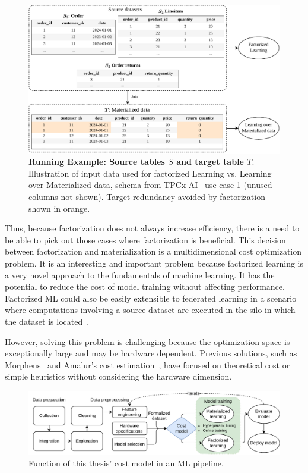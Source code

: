 \begin{figure}[h]
  \centering
  \includegraphics[width=0.95\linewidth]{chapters/01_introduction/figures/running-example-intro.pdf}
  \caption[Running Example: Source tables $S$ and target table $T$]{\textbf{Running Example: Source tables $S$ and target table $T$}. \\ Illustration of input data used for factorized Learning vs. Learning over Materialized data, schema from TPCx-AI~\cite{tpcx-ai} use case 1 (unused columns not shown). Target redundancy avoided by factorization shown in orange.}
  \label{fig:running-example-fac-vs-mat}
\end{figure}

Thus, because factorization does not always increase efficiency, there is a need to be able to pick out those cases where factorization is beneficial. This decision between factorization and materialization is a multidimensional cost optimization problem. It is an interesting and important problem because factorized learning is a very novel approach to the fundamentals of machine learning. It has the potential to reduce the cost of model training without affecting performance. Factorized ML could also be easily extensible to federated learning in a scenario where computations involving a source dataset are executed in the silo in which the dataset is located~\cite{amalur}.

However, solving this problem is challenging because the optimization space is exceptionally large and may be hardware dependent. Previous solutions, such as Morpheus~\cite{morpheus} and Amalur's cost estimation~\cite{amalur_tkde24}, have focused on theoretical cost or simple heuristics without considering the hardware dimension.

\begin{figure}[h]
  \centering
  \includegraphics[width=0.95\linewidth]{chapters/01_introduction/figures/ML-Pipeline.pdf}
  \caption{Function of this thesis' cost model in an ML pipeline.}
  \label{fig:ml-pipeline}
\end{figure}

